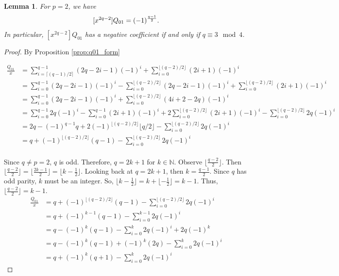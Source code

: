 \documentclass[11pt]{amsart}
\numberwithin{equation}{section}
\theoremstyle{plain}
\newtheorem{lemma}[equation]{Lemma}
\theoremstyle{definition}
\begin{document}

\begin{lemma}
For $p=2$, we have
$$[x^{2q-2}] Q_{01} = (-1)^{{q-1}\over2}. $$
In particular, $[x^{2q-2}] Q_{01}$ has a negative coefficient if and only if $q\equiv 3\mod 4$.
\end{lemma}

\begin{proof}

By Proposition \ref{prop:q01_form}

\begin{align*}
[x^{2q-2}]\frac{Q_{01}}{x}&=\sum_{i=\lceil (q-1)/2\rceil}^{q-1}(2q-2i-1)(-1)^i + \sum_{i=0}^{\lfloor(q-2)/2\rfloor}(2i+1)(-1)^i\\
&=\sum_{i=0}^{q-1}(2q-2i-1)(-1)^i -\sum_{i=0}^{\lfloor (q-2)/2\rfloor}(2q-2i-1)(-1)^i + \sum_{i=0}^{\lfloor(q-2)/2\rfloor}(2i+1)(-1)^i\\
&=\sum_{i=0}^{q-1}(2q-2i-1)(-1)^i  + \sum_{i=0}^{\lfloor(q-2)/2\rfloor}(4i+2-2q)(-1)^i\\
&=\sum_{i=0}^{q-1}2q(-1)^i-\sum_{i=0}^{q-1}(2i+1)(-1)^i  + 2\sum_{i=0}^{\lfloor(q-2)/2\rfloor}(2i+1)(-1)^i-\sum_{i=0}^{\lfloor(q-2)/2\rfloor}2q(-1)^i\\
&=2q-(-1)^{q-1}q  + 2(-1)^{\lfloor(q-2)/2\rfloor}\lfloor q/2\rfloor-\sum_{i=0}^{\lfloor(q-2)/2\rfloor}2q(-1)^i\\
&=q + (-1)^{\lfloor(q-2)/2\rfloor}(q-1)-\sum_{i=0}^{\lfloor(q-2)/2\rfloor}2q(-1)^i\\
\end{align*}

Since $q\not=p=2$, $q$ is odd. Therefore, $q=2k+1$ for $k\in \mathbb{N}$. Observe $\lfloor\frac{q-2}{2}\rfloor$. Then $\lfloor\frac{q-2}{2}\rfloor= \lfloor\frac{2k-1}{2}\rfloor=\lfloor k-\frac{1}{2}\rfloor$. Looking back at $q=2k+1$, then $k=\frac{q-1}{2}$. Since $q$ has odd parity, $k$ must be an integer. So, $\lfloor k-\frac{1}{2}\rfloor= k+\lfloor-\frac{1}{2}\rfloor= k-1$. Thus, $\lfloor\frac{q-2}{2}\rfloor=k-1$.
\\

\begin{align*}
[x^{2q-2}]\frac{Q_{01}}{x}&=q + (-1)^{\lfloor(q-2)/2\rfloor}(q-1)-\sum_{i=0}^{\lfloor(q-2)/2\rfloor}2q(-1)^i\\
&=q+(-1)^{k-1}(q-1)-\sum_{i=0}^{k-1}2q(-1)^i\\
&=q-(-1)^k(q-1)-\sum_{i=0}^{k}2q(-1)^i+2q(-1)^{k}\\
&=q-(-1)^k(q-1)+(-1)^k(2q)-\sum_{i=0}^{k}2q(-1)^i\\
&=q+(-1)^k(q+1)-\sum_{i=0}^{k}2q(-1)^i
\end{align*}


\end{proof}
\end{document}
